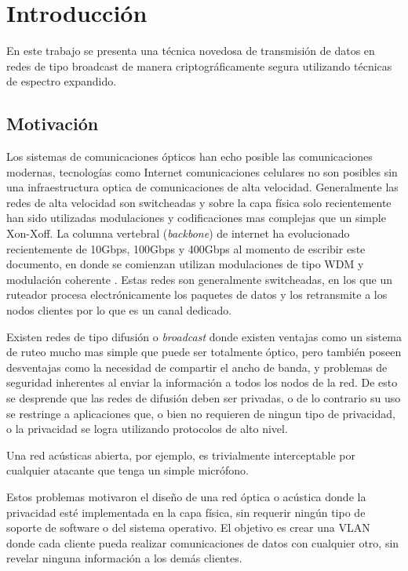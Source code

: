 \chapter{Introducción}

En este trabajo se presenta una técnica novedosa de transmisión de datos en redes de tipo broadcast de manera criptográficamente segura utilizando técnicas de espectro expandido.

\section{Motivación}
Los sistemas de comunicaciones ópticos han echo posible las comunicaciones modernas, tecnologías como Internet comunicaciones celulares no son posibles sin una infraestructura optica de comunicaciones de alta velocidad.
Generalmente las redes de alta velocidad son switcheadas y sobre la capa física solo recientemente han sido utilizadas modulaciones y codificaciones mas complejas que un simple Xon-Xoff.
La columna vertebral (\textit{backbone}) de internet ha evolucionado recientemente de 10Gbps, 100Gbps y 400Gbps al momento de escribir este documento, en donde se comienzan utilizan modulaciones de tipo WDM y modulación coherente \cite{shieh2008coherent}. Estas redes son generalmente switcheadas, en los que un ruteador procesa electrónicamente los paquetes de datos y los retransmite a los nodos clientes por lo que es un canal dedicado.

Existen redes de tipo difusión o \textit{broadcast} donde existen ventajas como un sistema de ruteo mucho mas simple que puede ser totalmente óptico, pero también poseen desventajas como la necesidad de compartir el ancho de banda, y problemas de seguridad inherentes al enviar la información a todos los nodos de la red. De esto se desprende que las redes de difusión deben ser privadas, o de lo contrario su uso se restringe a aplicaciones que, o bien no requieren de ningun tipo de privacidad, o la privacidad se logra utilizando protocolos de alto nivel.

Una red acústicas abierta, por ejemplo, es trivialmente interceptable por cualquier atacante que tenga un simple micrófono. 

Estos problemas motivaron el diseño de una red óptica o acústica donde la privacidad esté implementada en la capa física, sin requerir ningún tipo de soporte de software o del sistema operativo. El objetivo es crear una VLAN donde cada cliente pueda realizar comunicaciones de datos con cualquier otro, sin revelar ninguna información a los demás clientes.

